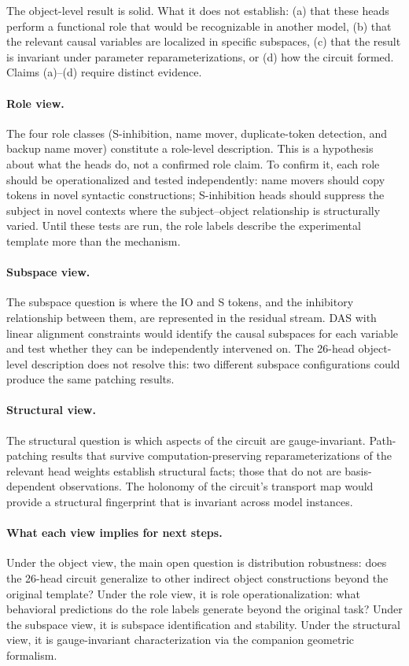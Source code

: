\documentclass[11pt]{article}
\theoremstyle{remark}
\begin{document}
The object-level result is solid.  What it does not establish: (a) that
these heads perform a functional role that would be recognizable in
another model, (b) that the relevant causal variables are localized in
specific subspaces, (c) that the result is invariant under parameter
reparameterizations, or (d) how the circuit formed.  Claims (a)--(d)
require distinct evidence.

\paragraph{Role view.}
The four role classes (S-inhibition, name mover, duplicate-token
detection, and backup name mover) constitute a role-level description.
This is a hypothesis about what the heads do, not a confirmed role claim.
To confirm it, each role should be operationalized and tested
independently: name movers should copy tokens in novel syntactic
constructions; S-inhibition heads should suppress the subject in novel
contexts where the subject--object relationship is structurally varied.
Until these tests are run, the role labels describe the experimental
template more than the mechanism.

\paragraph{Subspace view.}
The subspace question is where the IO and S tokens, and the inhibitory
relationship between them, are represented in the residual stream.
DAS with linear alignment constraints would identify the causal
subspaces for each variable and test whether they can be independently
intervened on.  The 26-head object-level description does not resolve
this: two different subspace configurations could produce the same
patching results.

\paragraph{Structural view.}
The structural question is which aspects of the circuit are
gauge-invariant.  Path-patching results that survive
computation-preserving reparameterizations of the relevant head weights
establish structural facts; those that do not are basis-dependent
observations.  The holonomy of the circuit's transport map would provide
a structural fingerprint that is invariant across model instances.

\paragraph{What each view implies for next steps.}
Under the object view, the main open question is distribution
robustness: does the 26-head circuit generalize to other indirect
object constructions beyond the original template?  Under the role
view, it is role operationalization: what behavioral predictions do
the role labels generate beyond the original task?  Under the subspace
view, it is subspace identification and stability.  Under the structural
view, it is gauge-invariant characterization via the companion geometric
formalism.
\end{document}
